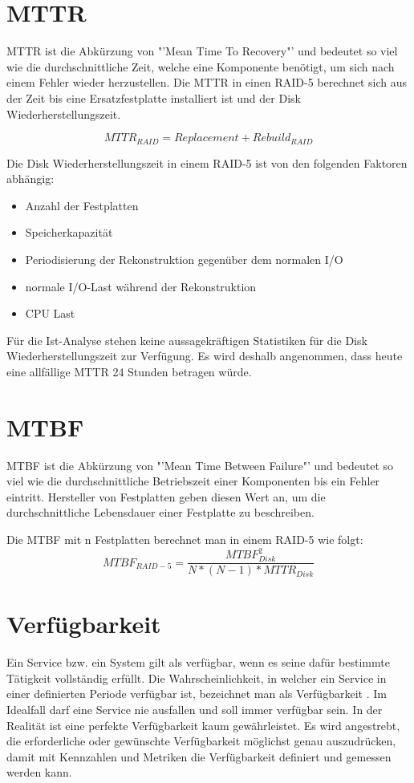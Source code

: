 \section{MTTR}
MTTR ist die Abkürzung von "'Mean Time To Recovery"' und bedeutet so viel wie die durchschnittliche Zeit, welche eine Komponente benötigt, um sich nach einem Fehler wieder herzustellen. Die MTTR in einen RAID-5 berechnet sich aus der Zeit bis eine Ersatzfestplatte installiert ist und der Disk Wiederherstellungszeit. 

\begin{equation}
MTTR_{RAID}=Replacement+Rebuild_{RAID}
\label{eqn:MTTR-RAID-5}
\end{equation}

Die Disk Wiederherstellungszeit in einem RAID-5 ist von den folgenden Faktoren abhängig:
\begin{itemize}
\item Anzahl der Festplatten
\item Speicherkapazität
\item Periodisierung der Rekonstruktion gegenüber dem normalen I/O
\item normale I/O-Last während der Rekonstruktion
\item CPU Last
\end{itemize}

Für die Ist-Analyse stehen keine aussagekräftigen Statistiken für die Disk Wiederherstellungszeit zur Verfügung. Es wird deshalb angenommen, dass heute eine allfällige MTTR 24 Stunden betragen würde.


\section{MTBF}
MTBF ist die Abkürzung von "'Mean Time Between Failure"' und bedeutet so viel wie die durchschnittliche Betriebszeit einer Komponenten bis ein Fehler eintritt. Hersteller von Festplatten geben diesen Wert an, um die durchschnittliche Lebensdauer einer Festplatte zu beschreiben. 

Die MTBF mit n Festplatten berechnet man in einem RAID-5 \cite{Chen1994} wie folgt:
\begin{equation}
MTBF_{RAID-5}=\frac{MTBF_{Disk}^2}{N*(N-1)*MTTR_{Disk}}
\label{eqn:MTBF-RAID-5}
\end{equation}

\section{Verfügbarkeit}
Ein Service bzw. ein System gilt als verfügbar, wenn es seine dafür bestimmte Tätigkeit vollständig erfüllt. Die Wahrscheinlichkeit, in welcher ein Service in einer definierten Periode verfügbar ist, bezeichnet man als Verfügbarkeit \cite{Held2004}. Im Idealfall darf eine Service nie ausfallen und soll immer verfügbar sein. In der Realität ist eine perfekte Verfügbarkeit kaum gewährleistet. Es wird angestrebt, die erforderliche oder gewünschte Verfügbarkeit möglichst genau auszudrücken, damit mit Kennzahlen und Metriken die Verfügbarkeit definiert und gemessen werden kann. 

